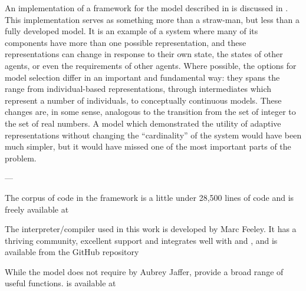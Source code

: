 An implementation of a framework for the model described in \Cthree is
discussed in \Cfive.  This implementation serves as something more
than a straw-man, but less than a fully developed model.  It is an
example of a system where many of its components have more than one
possible representation, and these representations can change in
response to their own state, the states of other agents, or even the
requirements of other agents.  Where possible, the options for model
selection differ in an important and fundamental way: they spans the
range from individual-based representations, through intermediates
which represent a number of individuals, to conceptually continuous
models. These changes are, in some sense, analogous to the transition
from the set of integer to the set of real numbers.  A model which
demonstrated the utility of adaptive representations without changing
the ``cardinality'' of the system would have been much simpler, but it
would have missed one of the most important parts of the problem.

\begin{center}
---
\end{center}

The corpus of code in the framework is a little under 28,500 lines of
\Scheme code and is freely available at\\
\makebox[\textwidth]{\repos}

The interpreter/compiler used in this work is \Gambit developed by
Marc Feeley.  It has a thriving community, excellent support and
integrates well with \CC and \Cpp, and is available from the GitHub
repository\\

While the model does not require \SLIB by Aubrey Jaffer, \SLIB
provide a broad range of useful functions. \SLIB is available at\\



